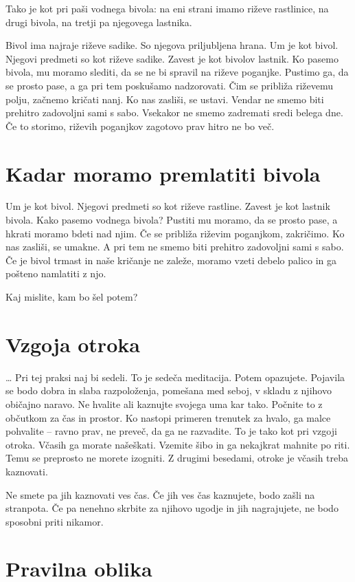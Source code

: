 Tako je kot pri paši vodnega bivola: na eni strani imamo riževe rastlinice, na drugi bivola, na tretji pa njegovega lastnika.

Bivol ima najraje riževe sadike. So njegova priljubljena hrana. Um je kot bivol. Njegovi predmeti so kot riževe sadike. Zavest je kot bivolov lastnik. Ko pasemo bivola, mu moramo slediti, da se ne bi spravil na riževe poganjke. Pustimo ga, da se prosto pase, a ga pri tem poskušamo nadzorovati. Čim se približa riževemu polju, začnemo kričati nanj. Ko nas zasliši, se ustavi. Vendar ne smemo biti prehitro zadovoljni sami s sabo. Vsekakor ne smemo zadremati sredi belega dne. Če to storimo, riževih poganjkov zagotovo prav hitro ne bo več.

\section{Kadar moramo premlatiti bivola}

Um je kot bivol. Njegovi predmeti so kot riževe rastline. Zavest je kot lastnik bivola. Kako pasemo vodnega bivola? Pustiti mu moramo, da se prosto pase, a hkrati moramo bdeti nad njim. Če se približa riževim poganjkom, zakričimo. Ko nas zasliši, se umakne. A pri tem ne smemo biti prehitro zadovoljni sami s sabo. Če je bivol trmast in naše kričanje ne zaleže, moramo vzeti debelo palico in ga pošteno namlatiti z njo.

Kaj mislite, kam bo šel potem?

\section{Vzgoja otroka}

\ldots{} Pri tej praksi naj bi sedeli. To je sedeča meditacija. Potem opazujete. Pojavila se bodo dobra in slaba razpoloženja, pomešana med seboj, v skladu z njihovo običajno naravo. Ne hvalite ali kaznujte svojega uma kar tako. Počnite to z občutkom za čas in prostor. Ko nastopi primeren trenutek za hvalo, ga malce pohvalite – ravno prav, ne preveč, da ga ne razvadite. To je tako kot pri vzgoji otroka. Včasih ga morate našeškati. Vzemite šibo in ga nekajkrat mahnite po riti. Temu se preprosto ne morete izogniti. Z drugimi besedami, otroke je včasih treba kaznovati.

Ne smete pa jih kaznovati ves čas. Če jih ves čas kaznujete, bodo zašli na stranpota. Če pa nenehno skrbite za njihovo ugodje in jih nagrajujete, ne bodo sposobni priti nikamor.

\section{Pravilna oblika}

